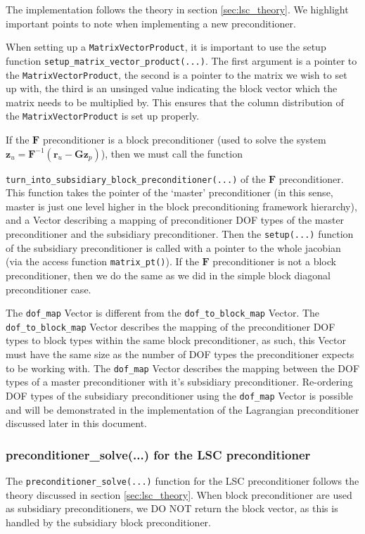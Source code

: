 The implementation follows the theory in section \ref{sec:lsc_theory}. We highlight important points to note when implementing a new preconditioner. 


When setting up a \verb+MatrixVectorProduct+, it is important to use the setup function \verb+setup_matrix_vector_product(...)+. The first argument is a pointer to the \verb+MatrixVectorProduct+, the second is a pointer to the matrix we wish to set up with, the third is an unsinged value indicating the block vector which the matrix needs to be multiplied by. This ensures that the column distribution of the \verb+MatrixVectorProduct+ is set up properly.


If the $\mathbf{F}$ preconditioner is a block preconditioner (used to solve the system $\mathbf{z}_u = \mathbf{F}^{-1} \left( \mathbf{r}_u - \mathbf{G} \mathbf{z}_p \right)$), then we must call the function 

\noindent\verb+turn_into_subsidiary_block_preconditioner(...)+ of the $\mathbf{F}$ preconditioner. This function takes the pointer of the `master' preconditioner (in this sense, master is just one level higher in the block preconditioning framework hierarchy), and a Vector describing a mapping of preconditioner DOF types of the master preconditioner and the subsidiary preconditioner. Then the \verb+setup(...)+ function of the subsidiary preconditioner is called with a pointer to the whole jacobian (via the access function \verb+matrix_pt()+). If the $\mathbf{F}$ preconditioner is not a block preconditioner, then we do the same as we did in the simple block diagonal preconditioner case.

The \verb+dof_map+ Vector is different from the \verb+dof_to_block_map+ Vector. The \verb+dof_to_block_map+ Vector describes the mapping of the preconditioner DOF types to block types within the same block preconditioner, as such, this Vector must have the same size as the number of DOF types the preconditioner expects to be working with. The \verb+dof_map+ Vector describes the mapping between the DOF types of a master preconditioner with it's subsidiary preconditioner. Re-ordering DOF types of the subsidiary preconditioner using the \verb+dof_map+ Vector is possible and will be demonstrated in the implementation of the Lagrangian preconditioner discussed later in this document.


\subsubsection{preconditioner\_solve(...) for the LSC preconditioner\label{sec:lsc_implementation_precsolve}}
The \verb+preconditioner_solve(...)+ function for the LSC preconditioner follows the theory discussed in section \ref{sec:lsc_theory}. When block preconditioner are used as subsidiary preconditioners, we DO NOT return the block vector, as this is handled by the subsidiary block preconditioner.



